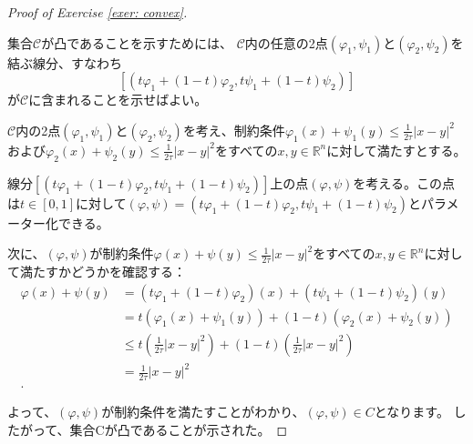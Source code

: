 \documentclass{jsarticle}
\theoremstyle{definition}
\begin{document}
\begin{proof}[Proof of Exercise \ref{exer: convex}]
  \label{proof:convex}

  集合$\mathcal{C}$が凸であることを示すためには、
  $\mathcal{C}$内の任意の2点\((\varphi_1, \psi_1)\)と\((\varphi_2, \psi_2)\)を結ぶ線分、すなわち
  \[
    [(t\varphi_1 + (1-t)\varphi_2, t\psi_1 + (1-t)\psi_2)]
  \]
  が$\mathcal{C}$に含まれることを示せばよい。

  $\mathcal{C}$内の2点\((\varphi_1, \psi_1)\)と\((\varphi_2, \psi_2)\)を考え、制約条件\(\varphi_1(x) + \psi_1(y) \leq \frac{1}{2\tau}|x - y|^2\)および\(\varphi_2(x) + \psi_2(y) \leq \frac{1}{2\tau}|x - y|^2\)をすべての\(x, y \in \mathbb{R}^n\)に対して満たすとする。

  線分\([(t\varphi_1 + (1-t)\varphi_2, t\psi_1 + (1-t)\psi_2)]\)上の点\((\varphi, \psi)\)を考える。この点は\(t \in [0, 1]\)に対して\((\varphi, \psi) = (t\varphi_1 + (1 - t)\varphi_2, t\psi_1 + (1 - t)\psi_2)\)とパラメーター化できる。

  次に、\((\varphi, \psi)\)が制約条件\(\varphi(x) + \psi(y) \leq \frac{1}{2\tau}|x - y|^2\)をすべての\(x, y \in \mathbb{R}^n\)に対して満たすかどうかを確認する：
  \begin{align*}
    \varphi(x) + \psi(y) &= (t\varphi_1 + (1 - t)\varphi_2)(x) + (t\psi_1 + (1 - t)\psi_2)(y)\\
                        &= t(\varphi_1(x) + \psi_1(y)) + (1 - t)(\varphi_2(x) + \psi_2(y))\\
                        &\leq t\left(\frac{1}{2\tau}|x - y|^2\right) + (1 - t)\left(\frac{1}{2\tau}|x - y|^2\right)\\
                        &= \frac{1}{2\tau}|x - y|^2\\.
  \end{align*}

  よって、\((\varphi, \psi)\)が制約条件を満たすことがわかり、\((\varphi, \psi) \in C\)となります。
  したがって、集合Cが凸であることが示された。
\end{proof}

\end{document}
